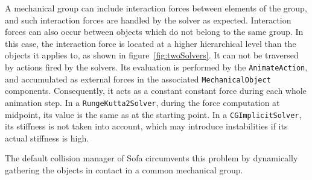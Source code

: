 A mechanical group can include interaction forces between elements of the group, and such interaction forces are handled by the solver as expected.
Interaction forces can also occur between objects which do not belong to the same group.
In this case, the interaction force is located at a higher hierarchical level than the objects it applies to, as shown in figure~\ref{fig:twoSolvers}.
It can not be traversed by actions fired by the solvers.
Its evaluation is performed by the \texttt{AnimateAction}, and accumulated as external forces in the associated \texttt{MechanicalObject} components.
Consequently, it acts as a constant constant force during each whole animation step.
In a \texttt{RungeKutta2Solver}, during the force computation at midpoint, its value is the same as at the starting point.
In a \texttt{CGImplicitSolver}, its stiffness is not taken into account, which may introduce instabilities if its actual stiffness is high.

The default collision manager of Sofa circumvents this problem by dynamically gathering the objects in contact in a common mechanical group.

% 
% 
% 

